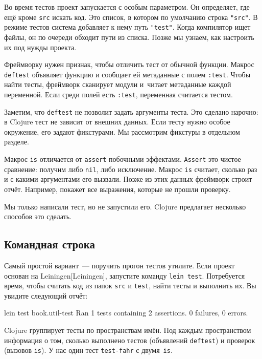 Во время тестов проект запускается с особым параметром. Он определяет, где ещё
кроме \verb|src| искать код. Это список, в котором по умолчанию строка
\verb|"src"|. В режиме тестов система добавляет к нему путь \verb|"test"|. Когда
компилятор ищет файлы, он по очереди обходит пути из списка. Позже мы узнаем,
как настроить их под нужды проекта.


Фреймворку нужен признак, чтобы отличить тест от обычной функции. Макрос
\verb|deftest| объявляет функцию и сообщает ей метаданные с полем
\verb|:test|. Чтобы найти тесты, фреймворк сканирует модули и~читает метаданные
каждой переменной. Если среди полей есть \verb|:test|, переменная считается
тестом.

Заметим, что \verb|deftest| не позволит задать аргументы теста. Это сделано
нарочно: в Clojure тест не зависит от внешних данных. Если тесту нужно особое
окружение, его задают фикстурами. Мы рассмотрим фикстуры в отдельном разделе.

Макрос \verb|is| отличается от \verb|assert| побочными
эффектами. \verb|Assert| это чистое сравнение: получим либо \verb|nil|, либо
исключение. Макрос \verb|is| считает, сколько раз и с какими аргументами его
вызвали. Позже из этих данных фреймворк строит отчёт. Например, покажет все
выражения, которые не прошли проверку.

Мы только написали тест, но не запустили его. Clojure предлагает несколько
способов это сделать.

\subsection{Командная строка}


Самый простой вариант~--- поручить прогон тестов утилите. Если проект основан на
Leiningen[Leiningen], запустите команду \verb|lein test|.
Потребуется время, чтобы считать код из папок \verb|src| и \verb|test|,
найти тесты и выполнить их. Вы увидите следующий отчёт:

\begin{english}
  \begin{text}
lein test book.util-test
Ran 1 tests containing 2 assertions.
0 failures, 0 errors.
  \end{text}
\end{english}

Clojure группирует тесты по пространствам имён. Под каждым пространством
информация о том, сколько выполнено тестов (объявлений \verb|deftest|) и
проверок (вызовов \verb|is|). У нас один тест \verb|test-fahr| с
двумя~\verb|is|.

